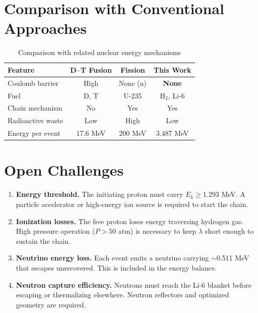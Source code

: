 \documentclass[12pt,a4paper]{article}
\begin{document}
\section{Comparison with Conventional Approaches}

\begin{table}[h!]
\centering
\caption{Comparison with related nuclear energy mechanisms}
\vspace{0.5em}
\begin{tabular}{lccc}
\toprule
\textbf{Feature} & \textbf{D--T Fusion} & \textbf{Fission} & \textbf{This Work} \\
\midrule
Coulomb barrier    & High      & None (n)  & \textbf{None} \\
Fuel               & D, T      & U-235     & H$_2$, Li-6   \\
Chain mechanism    & No        & Yes       & Yes           \\
Radioactive waste  & Low       & High      & Low           \\
Energy per event   & 17.6 MeV  & 200 MeV   & 3.487 MeV     \\
\bottomrule
\end{tabular}
\end{table}

\section{Open Challenges}

\begin{enumerate}

  \item \textbf{Energy threshold.}
    The initiating proton must carry $E_k \geq 1.293$ MeV. A
    particle accelerator or high-energy ion source is required to
    start the chain.

  \item \textbf{Ionization losses.}
    The free proton loses energy traversing hydrogen gas. High
    pressure operation ($P > 50$ atm) is necessary to keep $\lambda$
    short enough to sustain the chain.

  \item \textbf{Neutrino energy loss.}
    Each event emits a neutrino carrying $\sim$0.511 MeV that
    escapes unrecovered. This is included in the energy balance.

  \item \textbf{Neutron capture efficiency.}
    Neutrons must reach the Li-6 blanket before escaping or
    thermalizing elsewhere. Neutron reflectors and optimized
    geometry are required.

\end{enumerate}
\end{document}

